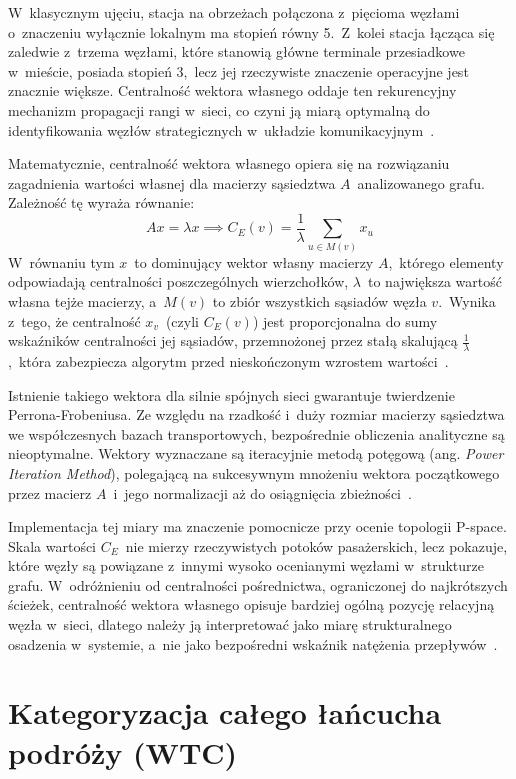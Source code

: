 \documentclass{pracamgr}
\begin{document}
W~klasycznym ujęciu, stacja na obrzeżach połączona z~pięcioma węzłami o~znaczeniu wyłącznie lokalnym ma stopień równy 5.~Z~kolei stacja łącząca się zaledwie z~trzema węzłami, które stanowią główne terminale przesiadkowe w~mieście, posiada stopień 3,~lecz jej rzeczywiste znaczenie operacyjne jest znacznie większe. Centralność wektora własnego oddaje ten rekurencyjny mechanizm propagacji rangi w~sieci, co czyni ją miarą optymalną do identyfikowania węzłów strategicznych w~układzie komunikacyjnym~\cite{hubs}.

Matematycznie, centralność wektora własnego opiera się na rozwiązaniu zagadnienia wartości własnej dla macierzy sąsiedztwa $A$~analizowanego grafu. Zależność tę wyraża równanie:
$$A x = \lambda x \implies C_E(v) = \frac{1}{\lambda} \sum_{u \in M(v)} x_u$$
W~równaniu tym $x$~to dominujący wektor własny macierzy $A$,~którego elementy odpowiadają centralności poszczególnych wierzchołków, $\lambda$~to największa wartość własna tejże macierzy, a~$M(v)$ to zbiór wszystkich sąsiadów węzła $v$.~Wynika z~tego, że centralność $x_v$~(czyli $C_E(v)$) jest proporcjonalna do sumy wskaźników centralności jej sąsiadów, przemnożonej przez stałą skalującą $\frac{1}{\lambda}$,~która zabezpiecza algorytm przed nieskończonym wzrostem wartości~\cite{core_area, hypergraph, eigenvector_centrality_network_x}.

Istnienie takiego wektora dla silnie spójnych sieci gwarantuje twierdzenie Perrona-Frobeniusa. Ze względu na rzadkość i~duży rozmiar macierzy sąsiedztwa we współczesnych bazach transportowych, bezpośrednie obliczenia analityczne są nieoptymalne. Wektory wyznaczane są iteracyjnie metodą potęgową (ang. \textit{Power Iteration Method}), polegającą na sukcesywnym mnożeniu wektora początkowego przez macierz $A$~i~jego normalizacji aż do osiągnięcia zbieżności~\cite{hypergraph, eigenvector_centrality_network_x}.

Implementacja tej miary ma znaczenie pomocnicze przy ocenie topologii \mbox{P-space}. Skala wartości $C_E$~nie mierzy rzeczywistych potoków pasażerskich, lecz pokazuje, które węzły są powiązane z~innymi wysoko ocenianymi węzłami w~strukturze grafu. W~odróżnieniu od centralności pośrednictwa, ograniczonej do najkrótszych ścieżek, centralność wektora własnego opisuje bardziej ogólną pozycję relacyjną węzła w~sieci, dlatego należy ją interpretować jako miarę strukturalnego osadzenia w~systemie, a~nie jako bezpośredni wskaźnik natężenia przepływów~\cite{hubs, robustness, characteristics}.

\section{Kategoryzacja całego łańcucha podróży (WTC)}
\end{document}
